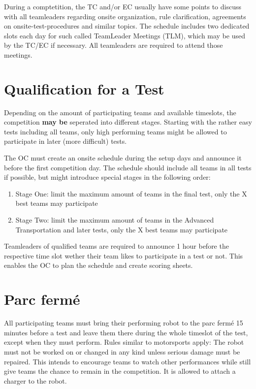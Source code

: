 During a comptetition, the TC and/or EC usually have some points to discuss with all teamleaders regarding onsite organization, rule clarification, agreements on onsite-test-procedures and similar topics.
The schedule includes two dedicated slots each day for such called TeamLeader Meetings (TLM), which may be used by the TC/EC if necessary.
All teamleaders are required to attend those meetings.


\section{Qualification for a Test}
\label{sec:qulaification for a test}

Depending on the amount of participating teams and available timeslots, 
the competition \textbf{may be} seperated into different stages.
Starting with the rather easy tests including all teams, only high performing teams might be allowed to participate in later (more difficult) tests.

The OC must create an onsite schedule during the setup days and announce it before the first competition day. 
The schedule should include all teams in all tests if possible,
but might introduce special stages in the following order:
\begin{enumerate}
\item Stage One: limit the maximum amount of teams in the final test, only the X best teams may participate
\item Stage Two: limit the maximum amount of teams in the Advanced Transportation and later tests, only the X best teams may participate
\end{enumerate}

Teamleaders of qualified teams are required to announce 1 hour before the respective time slot wether their team likes to participate in a test or not. 
This enables the OC to plan the schedule and create scoring sheets.

\section{Parc ferm\'e}

All participating teams must bring their performing robot to the parc ferm\'e 15 minutes before a test and leave them there during the whole timeslot of the test, except when they must perform.
Rules similar to motorsports apply: The robot must not be worked on or changed in any kind unless
serious damage must be repaired. This intends to encourage teams to watch other performances while still give teams the chance to remain in the competition. It is allowed to attach a charger to the robot.

